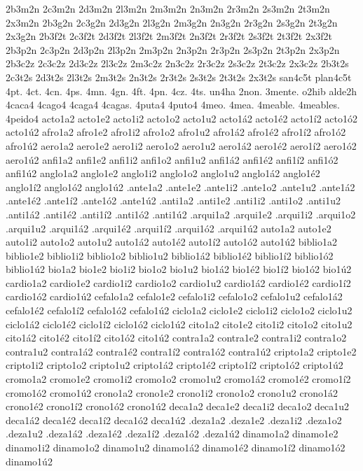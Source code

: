 {2b3m2n 2c3m2n 2d3m2n 2l3m2n 2m3m2n 2n3m2n 2r3m2n 2s3m2n 2t3m2n 2x3m2n 
2b3g2n 2c3g2n 2d3g2n 2l3g2n 2m3g2n 2n3g2n 2r3g2n 2s3g2n 2t3g2n 2x3g2n 
2b3f2t 2c3f2t 2d3f2t 2l3f2t 2m3f2t 2n3f2t 2r3f2t 2s3f2t 2t3f2t 2x3f2t 
2b3p2n 2c3p2n 2d3p2n 2l3p2n 2m3p2n 2n3p2n 2r3p2n 2s3p2n 2t3p2n 2x3p2n 
2b3c2z 2c3c2z 2d3c2z 2l3c2z 2m3c2z 2n3c2z 2r3c2z 2s3c2z 2t3c2z 2x3c2z 
2b3t2s 2c3t2s 2d3t2s 2l3t2s 2m3t2s 2n3t2s 2r3t2s 2s3t2s 2t3t2s 2x3t2s 
san4c5t plan4c5t 
%
4pt. 4ct. 4cn. 4ps. 4mn. 4gn. 4ft. 4pn. 4cz. 4ts. 
un4ha 2non. 3mente. o2hib alde2h 
%
4caca4 4cago4 4caga4 4cagas. 4puta4 4puto4 4meo. 4mea. 
4meable. 4meables. 4peido4 
%
acto1a2 acto1e2 acto1i2 acto1o2 acto1u2 acto1á2 acto1é2 acto1í2 acto1ó2 acto1ú2 
afro1a2 afro1e2 afro1i2 afro1o2 afro1u2 afro1á2 afro1é2 afro1í2 afro1ó2 afro1ú2 
aero1a2 aero1e2 aero1i2 aero1o2 aero1u2 aero1á2 aero1é2 aero1í2 aero1ó2 aero1ú2 
anfi1a2 anfi1e2 anfi1i2 anfi1o2 anfi1u2 anfi1á2 anfi1é2 anfi1í2 anfi1ó2 anfi1ú2 
anglo1a2 anglo1e2 anglo1i2 anglo1o2 anglo1u2 anglo1á2 anglo1é2 anglo1í2 anglo1ó2 anglo1ú2 
.ante1a2 .ante1e2 .ante1i2 .ante1o2 .ante1u2 .ante1á2 .ante1é2 .ante1í2 .ante1ó2 .ante1ú2 
.anti1a2 .anti1e2 .anti1i2 .anti1o2 .anti1u2 .anti1á2 .anti1é2 .anti1í2 .anti1ó2 .anti1ú2 
.arqui1a2 .arqui1e2 .arqui1i2 .arqui1o2 .arqui1u2 .arqui1á2 .arqui1é2 .arqui1í2 .arqui1ó2 .arqui1ú2 
auto1a2 auto1e2 auto1i2 auto1o2 auto1u2 auto1á2 auto1é2 auto1í2 auto1ó2 auto1ú2 
biblio1a2 biblio1e2 biblio1i2 biblio1o2 biblio1u2 biblio1á2 biblio1é2 biblio1í2 biblio1ó2 biblio1ú2 
bio1a2 bio1e2 bio1i2 bio1o2 bio1u2 bio1á2 bio1é2 bio1í2 bio1ó2 bio1ú2 
cardio1a2 cardio1e2 cardio1i2 cardio1o2 cardio1u2 cardio1á2 cardio1é2 cardio1í2 cardio1ó2 cardio1ú2 
cefalo1a2 cefalo1e2 cefalo1i2 cefalo1o2 cefalo1u2 cefalo1á2 cefalo1é2 cefalo1í2 cefalo1ó2 cefalo1ú2 
ciclo1a2 ciclo1e2 ciclo1i2 ciclo1o2 ciclo1u2 ciclo1á2 ciclo1é2 ciclo1í2 ciclo1ó2 ciclo1ú2 
cito1a2 cito1e2 cito1i2 cito1o2 cito1u2 cito1á2 cito1é2 cito1í2 cito1ó2 cito1ú2 
contra1a2 contra1e2 contra1i2 contra1o2 contra1u2 contra1á2 contra1é2 contra1í2 contra1ó2 contra1ú2 
cripto1a2 cripto1e2 cripto1i2 cripto1o2 cripto1u2 cripto1á2 cripto1é2 cripto1í2 cripto1ó2 cripto1ú2 
cromo1a2 cromo1e2 cromo1i2 cromo1o2 cromo1u2 cromo1á2 cromo1é2 cromo1í2 cromo1ó2 cromo1ú2 
crono1a2 crono1e2 crono1i2 crono1o2 crono1u2 crono1á2 crono1é2 crono1í2 crono1ó2 crono1ú2 
deca1a2 deca1e2 deca1i2 deca1o2 deca1u2 deca1á2 deca1é2 deca1í2 deca1ó2 deca1ú2 
.deza1a2 .deza1e2 .deza1i2 .deza1o2 .deza1u2 .deza1á2 .deza1é2 .deza1í2 .deza1ó2 .deza1ú2 
dinamo1a2 dinamo1e2 dinamo1i2 dinamo1o2 dinamo1u2 dinamo1á2 dinamo1é2 dinamo1í2 dinamo1ó2 dinamo1ú2 
}
